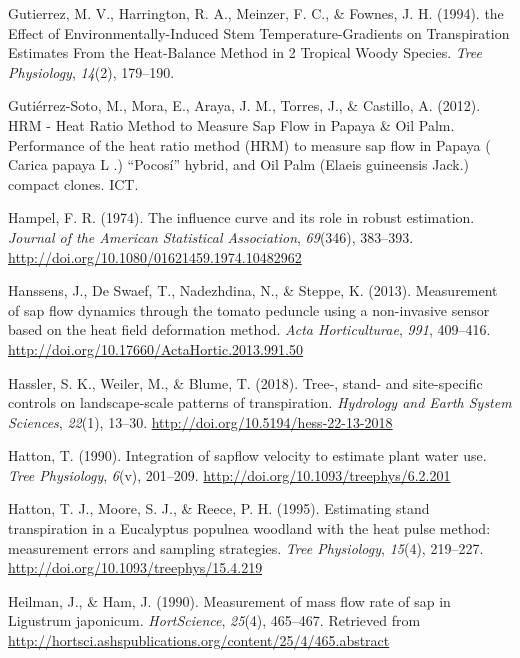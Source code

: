 \documentclass[11pt,twoside]{reedthesis}
\begin{document}
\hypertarget{ref-Gutierrez1994}{}
Gutierrez, M. V., Harrington, R. A., Meinzer, F. C., \& Fownes, J. H.
(1994). the Effect of Environmentally-Induced Stem Temperature-Gradients
on Transpiration Estimates From the Heat-Balance Method in 2 Tropical
Woody Species. \emph{Tree Physiology}, \emph{14}(2), 179--190.

\hypertarget{ref-Gutierrez-Soto2012}{}
Gutiérrez-Soto, M., Mora, E., Araya, J. M., Torres, J., \& Castillo, A.
(2012). HRM - Heat Ratio Method to Measure Sap Flow in Papaya \& Oil
Palm. Performance of the heat ratio method (HRM) to measure sap flow in
Papaya ( Carica papaya L .) ``Pocosí'' hybrid, and Oil Palm (Elaeis
guineensis Jack.) compact clones. ICT.

\hypertarget{ref-Hampel1974}{}
Hampel, F. R. (1974). The influence curve and its role in robust
estimation. \emph{Journal of the American Statistical Association},
\emph{69}(346), 383--393.
\url{http://doi.org/10.1080/01621459.1974.10482962}

\hypertarget{ref-Hanssens2013}{}
Hanssens, J., De Swaef, T., Nadezhdina, N., \& Steppe, K. (2013).
Measurement of sap flow dynamics through the tomato peduncle using a
non-invasive sensor based on the heat field deformation method.
\emph{Acta Horticulturae}, \emph{991}, 409--416.
\url{http://doi.org/10.17660/ActaHortic.2013.991.50}

\hypertarget{ref-Hassler2018}{}
Hassler, S. K., Weiler, M., \& Blume, T. (2018). Tree-, stand- and
site-specific controls on landscape-scale patterns of transpiration.
\emph{Hydrology and Earth System Sciences}, \emph{22}(1), 13--30.
\url{http://doi.org/10.5194/hess-22-13-2018}

\hypertarget{ref-Hatton1990}{}
Hatton, T. (1990). Integration of sapflow velocity to estimate plant
water use. \emph{Tree Physiology}, \emph{6}(v), 201--209.
\url{http://doi.org/10.1093/treephys/6.2.201}

\hypertarget{ref-Hatton1995}{}
Hatton, T. J., Moore, S. J., \& Reece, P. H. (1995). Estimating stand
transpiration in a Eucalyptus populnea woodland with the heat pulse
method: measurement errors and sampling strategies. \emph{Tree
Physiology}, \emph{15}(4), 219--227.
\url{http://doi.org/10.1093/treephys/15.4.219}

\hypertarget{ref-Heilman1990}{}
Heilman, J., \& Ham, J. (1990). Measurement of mass flow rate of sap in
Ligustrum japonicum. \emph{HortScience}, \emph{25}(4), 465--467.
Retrieved from
\url{http://hortsci.ashspublications.org/content/25/4/465.abstract}
\end{document}
